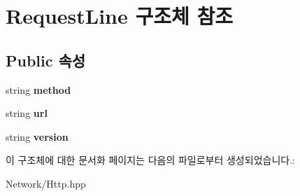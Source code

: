 \hypertarget{struct_request_line}{}\section{Request\+Line 구조체 참조}
\label{struct_request_line}
\subsection*{Public 속성}
\begin{DoxyCompactItemize}
\item 
\mbox{\label{struct_request_line_a9f03cf8862146eba3b7a61cab85e3e25}} 
string {\bfseries method}
\item 
\mbox{\label{struct_request_line_a96cb82de0b1f7cb9ac235217eeee7749}} 
string {\bfseries url}
\item 
\mbox{\label{struct_request_line_a92320c49c5e9b648d533edee029b3191}} 
string {\bfseries version}
\end{DoxyCompactItemize}


이 구조체에 대한 문서화 페이지는 다음의 파일로부터 생성되었습니다.\+:\begin{DoxyCompactItemize}
\item 
Network/Http.\+hpp\end{DoxyCompactItemize}
